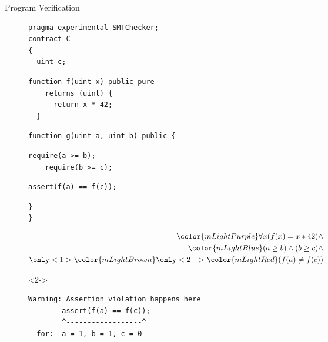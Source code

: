 \documentclass[aspectratio=169,10pt]{beamer}
\begin{document}
\begin{frame}[fragile]{Program Verification}
\begin{figure}
\noindent\begin{minipage}{.4\textwidth}
\begin{lstlisting}[basicstyle=\scriptsize]
pragma experimental SMTChecker;
contract C
{
  uint c;
\end{lstlisting}
{\color{mLightPurple}
\vspace*{-0.5cm}
\begin{lstlisting}[basicstyle=\scriptsize]
  function f(uint x) public pure
    returns (uint) {
      return x * 42;
  }
\end{lstlisting}
}
\vspace*{-0.5cm}
\begin{lstlisting}[basicstyle=\scriptsize]
  function g(uint a, uint b) public {
\end{lstlisting}
{\color{mLightBlue}
\vspace*{-0.5cm}
\begin{lstlisting}[basicstyle=\scriptsize]
    require(a >= b);
    require(b >= c);
\end{lstlisting}
}
{
\vspace*{-0.5cm}
\begin{lstlisting}[basicstyle=\scriptsize]
    assert(f(a) == f(c));
\end{lstlisting}
}
\vspace*{-0.5cm}
\begin{lstlisting}[basicstyle=\scriptsize]
  }
}
\end{lstlisting}
\end{minipage}
\begin{minipage}{.4\textwidth}
\begin{equation*}
\begin{split}
	{\color{mLightPurple}\forall x (f(x) = x * 42)} \land \\
	{\color{mLightBlue}(a \ge b) \land (b \ge c)} \land \\
	{\only<1>{\color{mLightBrown}}\only<2->{\color{mLightRed}}(f(a) \neq f(c))}
\end{split}
\end{equation*}
\begin{onlyenv}<2->
\begin{center}
{
\color{mLightYellow}
\begin{lstlisting}[basicstyle=\scriptsize]
Warning: Assertion violation happens here
        assert(f(a) == f(c));
        ^------------------^
  for:  a = 1, b = 1, c = 0
\end{lstlisting}
}
\end{center}
\end{onlyenv}


\end{minipage}
\end{figure}
\end{frame}
\end{document}
